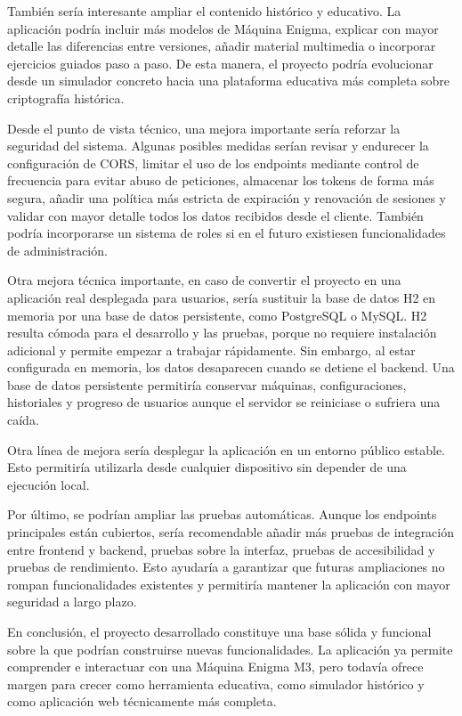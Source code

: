 También sería interesante ampliar el contenido histórico y educativo. La aplicación podría incluir más modelos de Máquina Enigma, explicar con mayor detalle las diferencias entre versiones, añadir material multimedia o incorporar ejercicios guiados paso a paso. De esta manera, el proyecto podría evolucionar desde un simulador concreto hacia una plataforma educativa más completa sobre criptografía histórica.

Desde el punto de vista técnico, una mejora importante sería reforzar la seguridad del sistema. Algunas posibles medidas serían revisar y endurecer la configuración de CORS, limitar el uso de los endpoints mediante control de frecuencia para evitar abuso de peticiones, almacenar los tokens de forma más segura, añadir una política más estricta de expiración y renovación de sesiones y validar con mayor detalle todos los datos recibidos desde el cliente. También podría incorporarse un sistema de roles si en el futuro existiesen funcionalidades de administración.

Otra mejora técnica importante, en caso de convertir el proyecto en una aplicación real desplegada para usuarios, sería sustituir la base de datos H2 en memoria por una base de datos persistente, como PostgreSQL o MySQL. H2 resulta cómoda para el desarrollo y las pruebas, porque no requiere instalación adicional y permite empezar a trabajar rápidamente. Sin embargo, al estar configurada en memoria, los datos desaparecen cuando se detiene el backend. Una base de datos persistente permitiría conservar máquinas, configuraciones, historiales y progreso de usuarios aunque el servidor se reiniciase o sufriera una caída.

Otra línea de mejora sería desplegar la aplicación en un entorno público estable. Esto permitiría utilizarla desde cualquier dispositivo sin depender de una ejecución local. 

Por último, se podrían ampliar las pruebas automáticas. Aunque los endpoints principales están cubiertos, sería recomendable añadir más pruebas de integración entre frontend y backend, pruebas sobre la interfaz, pruebas de accesibilidad y pruebas de rendimiento. Esto ayudaría a garantizar que futuras ampliaciones no rompan funcionalidades existentes y permitiría mantener la aplicación con mayor seguridad a largo plazo.

En conclusión, el proyecto desarrollado constituye una base sólida y funcional sobre la que podrían construirse nuevas funcionalidades. La aplicación ya permite comprender e interactuar con una Máquina Enigma M3, pero todavía ofrece margen para crecer como herramienta educativa, como simulador histórico y como aplicación web técnicamente más completa.
